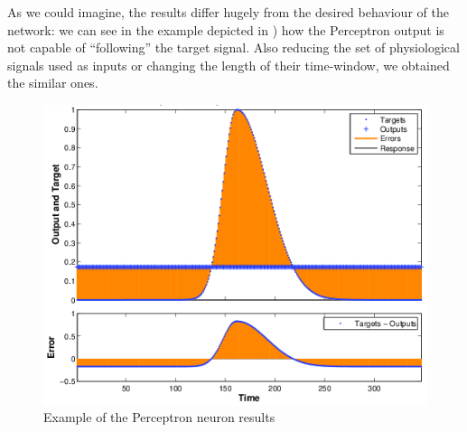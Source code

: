As we could imagine, the results differ hugely from the desired behaviour of the network: we can see in the example depicted in ) how the Perceptron output is not capable of ``following'' the target signal.
Also reducing the set of physiological signals used as inputs or changing the length of their time-window, we obtained the similar ones.
\begin{figure}[!ht]
\centering
\includegraphics[width=0.7\columnwidth]{images/results/perceptronResults}
\caption{Example of the Perceptron neuron results}
\label{fig:perceptronResults}
\end{figure}






